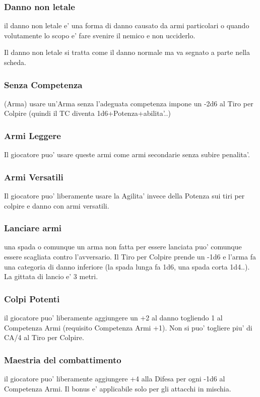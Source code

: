 \documentclass[a4paper,11pt,twoside,openany]{book}
\begin{document}
\subsubsection{Danno non letale} il danno non letale e' una forma di danno causato da armi particolari o quando volutamente lo scopo e' fare svenire il nemico e non ucciderlo.

Il danno non letale si tratta come il danno normale ma va segnato a parte nella scheda.

\subsubsection{Senza Competenza} (Arma) usare un'Arma senza l'adeguata competenza impone un -2d6 al Tiro per Colpire (quindi il TC diventa 1d6+Potenza+abilita'..) 

\subsubsection{Armi Leggere} Il giocatore puo' usare queste armi come armi secondarie senza subire penalita'.

\subsubsection{Armi Versatili} Il giocatore puo' liberamente usare la Agilita' invece della Potenza sui tiri per colpire e danno con armi versatili.

\subsubsection{Lanciare armi} una spada o comunque un arma non fatta per essere lanciata puo' comunque essere scagliata contro l'avversario.
Il Tiro per Colpire prende un -1d6 e l'arma fa una categoria di danno inferiore (la spada lunga fa 1d6, una spada corta 1d4..). La gittata di lancio e' 3 metri.

\subsubsection{Colpi Potenti} il giocatore puo' liberamente aggiungere un +2 al danno togliendo 1 al Competenza Armi (requisito Competenza Armi +1). Non si puo' togliere piu' di CA/4 al Tiro per Colpire.

\subsubsection{Maestria del combattimento} il giocatore puo' liberamente aggiungere +4 alla Difesa per ogni -1d6 al Competenza Armi. Il bonus e' applicabile solo per gli attacchi in mischia.
\end{document}
